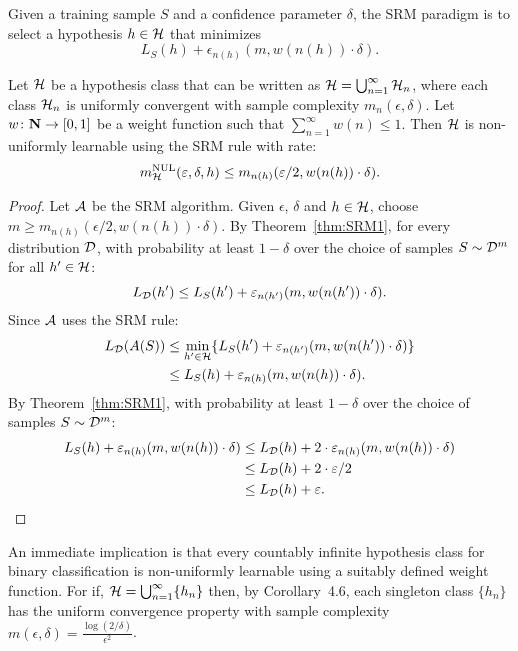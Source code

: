 Given a training sample $S$ and a confidence parameter $\delta$,
the SRM paradigm is to select a hypothesis $h \in \mathcal{H}$ that minimizes
\[
    L_S(h) + \epsilon_{n(h)} (m, w( n(h) ) \cdot \delta).
\]
\begin{theorem}
\label{thm:SRM2}
Let $\mathcal{H}$ be a hypothesis class that can be written as $\mathcal{H} =
\bigcup_{n = 1}^{\infty} \mathcal{H}_n$, where each class $\mathcal{H}_n$ is
uniformly convergent with sample complexity $m_n(\epsilon, \delta)$. Let $w
\colon \mathbf{N} \rightarrow [0, 1]$ be a weight function such that  $\sum_{n =
1}^{\infty} w(n) \leq 1$. Then $\mathcal{H}$ is non-uniformly learnable
using the SRM rule with rate:
\[
    m_{\mathcal{H}}^{\text{NUL}} (\varepsilon, \delta, h) \leq m_{n(h)} (\varepsilon / 2, w( n(h) ) \cdot \delta).
\]
\end{theorem}
\begin{proof}
Let $\mathcal{A}$ be the SRM algorithm. Given $\epsilon$, $\delta$ and $h \in \mathcal{H}$,
choose $m \geq m_{n(h)} (\epsilon / 2, w( n (h) ) \cdot \delta)$. By Theorem~\ref{thm:SRM1},
for every distribution $\mathcal{D}$, with probability at least  $1 - \delta$ over the choice
of samples $S \sim \mathcal{D}^m$ for all $h' \in \mathcal{H}$:
\[
    L_{\mathcal{D}} (h') \leq L_S(h') + \varepsilon_{n(h')} (m, w( n(h') ) \cdot \delta).
\]
Since $\mathcal{A}$ uses the SRM rule:
\begin{align*}
    L_{\mathcal{D}} (A(S))
        &  \leq \min_{h' \in \mathcal{H}} \{
            L_S(h') + \varepsilon_{n(h')} (m, w( n(h') ) \cdot \delta) \} \\
        & \leq L_S(h) +  \varepsilon_{n(h)} (m, w( n(h) ) \cdot \delta). \\
\end{align*}
By Theorem~\ref{thm:SRM1}, with probability at least  $1 - \delta$ over the choice of samples
$S \sim \mathcal{D}^m$:
\begin{align*}
    L_S(h) +  \varepsilon_{n(h)} (m, w( n(h) ) \cdot \delta)
        & \leq L_{\mathcal{D}}(h) +  2 \cdot \varepsilon_{n(h)} (m, w( n(h) ) \cdot \delta) \\
        & \leq L_{\mathcal{D}}(h) + 2 \cdot \varepsilon / 2 \\
        & \leq L_{\mathcal{D}}(h) + \varepsilon.
\end{align*}
\end{proof}

An immediate implication is that every countably infinite hypothesis class for
binary classification is non-uniformly learnable using a suitably defined weight
function. For if, $\mathcal{H} = \bigcup_{n = 1}^{\infty} \{ h_n \}$ then, by
Corollary~4.6, each singleton class $\{ h_n \}$ has the uniform convergence property with
sample complexity $m (\epsilon, \delta) = \frac{\log (2 / \delta)}{\epsilon^2}$.


